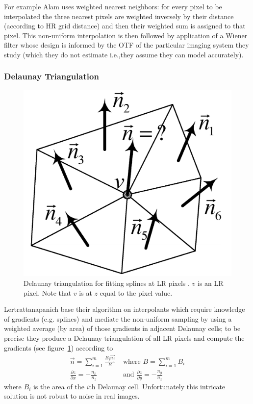 For example Alam  \cite{Alam2000} uses weighted nearest neighbors: for every pixel to be interpolated the three nearest pixels are weighted inversely by their distance (according to HR grid distance) and then their weighted sum is assigned to that pixel.
%
This non-uniform interpolation is then followed by application of a Wiener filter whose design is informed by the OTF of the particular imaging system they study (which they do not estimate i.e.,they assume they can model accurately).
%
\subsubsection{Delaunay Triangulation}

\begin{figure}
    \centering
    \includegraphics[width=.7\linewidth]{figures/classical/delauney.png}
    \caption{Delaunay triangulation for fitting splines at LR pixels \cite{Lertrattanapanich}. \(v\) is an LR pixel. Note that \(v\) is at \(z\) equal to the pixel value.}
    \label{fig:delauney}
\end{figure}
Lertrattanapanich  \cite{Lertrattanapanich} base their algorithm on interpolants which require knowledge of gradients (e.g. splines) and mediate the non-uniform sampling by using a weighted average (by area) of those gradients in adjacent Delaunay cells; to be precise they produce a Delaunay triangulation of all LR pixels and compute the gradients (see figure~\ref{fig:delauney}) according to
\begin{align*}
    \vec{n} = \sum_{i=1}^m \frac{B_j \vec{n_j}}{B}   & \text{ where } B=\sum_{i=1}^m B_i                              \\
    \frac{\partial z}{\partial x} = -\frac{n_x}{n_z} & \text{ and }  \frac{\partial z}{\partial y} = -\frac{n_y}{n_z}
\end{align*}
where \(B_i\) is the area of the \(i\)th Delaunay cell.
%
Unfortunately this intricate solution is not robust to noise in real images.
